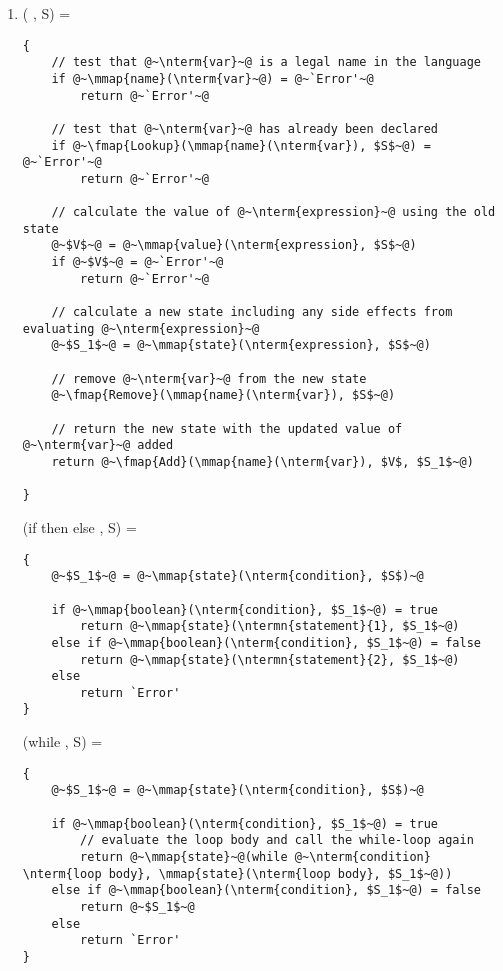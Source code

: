 \documentclass{article}
\begin{document}
\begin{enumerate}
\item {}( \peq {}, S) = \begin{lstlisting}
{
    // test that @~\nterm{var}~@ is a legal name in the language
    if @~\mmap{name}(\nterm{var}~@) = @~`Error'~@
        return @~`Error'~@
   
    // test that @~\nterm{var}~@ has already been declared
    if @~\fmap{Lookup}(\mmap{name}(\nterm{var}), $S$~@) = @~`Error'~@
        return @~`Error'~@

    // calculate the value of @~\nterm{expression}~@ using the old state
    @~$V$~@ = @~\mmap{value}(\nterm{expression}, $S$~@)
    if @~$V$~@ = @~`Error'~@
        return @~`Error'~@
   
    // calculate a new state including any side effects from evaluating @~\nterm{expression}~@
    @~$S_1$~@ = @~\mmap{state}(\nterm{expression}, $S$~@)

    // remove @~\nterm{var}~@ from the new state
    @~\fmap{Remove}(\mmap{name}(\nterm{var}), $S$~@)

    // return the new state with the updated value of @~\nterm{var}~@ added
    return @~\fmap{Add}(\mmap{name}(\nterm{var}), $V$, $S_1$~@)
             
}
\end{lstlisting}


(if  then  else , S) = \begin{lstlisting}
{
    @~$S_1$~@ = @~\mmap{state}(\nterm{condition}, $S$)~@
    
    if @~\mmap{boolean}(\nterm{condition}, $S_1$~@) = true
        return @~\mmap{state}(\ntermn{statement}{1}, $S_1$~@)
    else if @~\mmap{boolean}(\nterm{condition}, $S_1$~@) = false 
        return @~\mmap{state}(\ntermn{statement}{2}, $S_1$~@)
    else
        return `Error'
}
\end{lstlisting}


(while  , S) = \begin{lstlisting}
{
    @~$S_1$~@ = @~\mmap{state}(\nterm{condition}, $S$)~@
    
    if @~\mmap{boolean}(\nterm{condition}, $S_1$~@) = true
        // evaluate the loop body and call the while-loop again
        return @~\mmap{state}~@(while @~\nterm{condition} \nterm{loop body}, \mmap{state}(\nterm{loop body}, $S_1$~@))
    else if @~\mmap{boolean}(\nterm{condition}, $S_1$~@) = false 
        return @~$S_1$~@ 
    else
        return `Error'
}
\end{lstlisting}
\end{enumerate}
\end{document}

